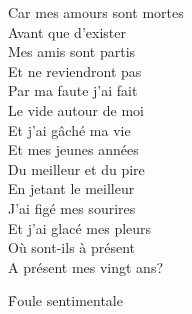 \documentclass{novel}
\begin{document}
\begin{multicols}{2}
Car mes amours sont mortes \\
Avant que d'exister \\
Mes amis sont partis \\
Et ne reviendront pas \\
Par ma faute j'ai fait \\
Le vide autour de moi \\
Et j'ai gâché ma vie \\
Et mes jeunes années \\

Du meilleur et du pire \\
En jetant le meilleur \\
J'ai figé mes sourires \\
Et j'ai glacé mes pleurs \\
Où sont-ils à présent \\
A présent mes vingt ans? \\
\end{multicols}

\newpage
\large

\h*{Foule sentimentale}
\end{document}
